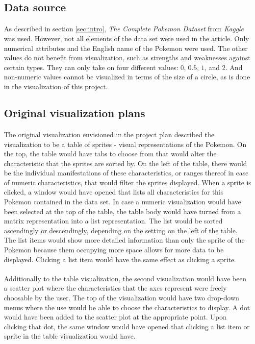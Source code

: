 \documentclass[12pt, a4paper]{article}
\begin{document}
		\subsection{Data source}
			\paragraph{}
				As described in section \ref{sec:intro}, \textit{The Complete Pokemon Dataset} from \textit{Kaggle} was used. However, not all elements of the data set were used in the article. Only numerical attributes and the English name of the Pokemon were used. The other values do not benefit from visualization, such as strengths and weaknesses against certain types. They can only take on four different values: $0$, $0.5$, $1$, and $2$. And non-numeric values cannot be visualized in terms of the size of a circle, as is done in the visualization of this project.
		\subsection{Original visualization plans}\label{sec:ogviz}
			\paragraph{}
				The original visualization envisioned in the project plan described the visualization to be a table of sprites - visual representations of the Pokemon. On the top, the table would have tabs to choose from that would alter the characteristic that the sprites are sorted by. On the left of the table, there would be the individual manifestations of these characteristics, or ranges thereof in case of numeric characteristics, that would filter the sprites displayed. When a sprite is clicked, a window would have opened that lists all characteristics for this Pokemon contained in the data set. In case a numeric visualization would have been selected at the top of the table, the table body would have turned from a matrix representation into a list representation. The list would be sorted ascendingly or descendingly, depending on the setting on the left of the table. The list items would show more detailed information than only the sprite of the Pokemon because them occupying more space allows for more data to be displayed. Clicking a list item would have the same effect as clicking a sprite.
			\paragraph{}
				Additionally to the table visualization, the second visualization would have been a scatter plot where the characteristics that the axes represent were freely choosable by the user. The top of the visualization would have two drop-down menus where the use would be able to choose the characteristics to display. A dot would have been added to the scatter plot at the appropriate point. Upon clicking that dot, the same window would have opened that clicking a list item or sprite in the table visualization would have.
\end{document}
